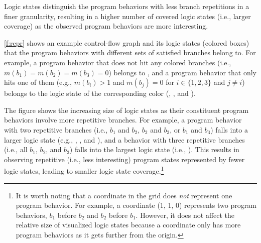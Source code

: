 \documentclass[letterpaper,twocolumn,10pt]{article}
\begin{document}
Logic states distinguish the program behaviors with less branch repetitions in a
finer granularity, resulting in a higher number of covered logic states (i.e.,
larger coverage) as the observed program behaviors are more interesting.


\autoref{f:repr} shows an example control-flow graph and its logic states
(colored boxes) that the program behaviors with different sets of satisfied
branches belong to.
For example, a program behavior that does not hit any colored branches (i.e.,
$m(b_1)=m(b_2)=m(b_3)=0$) belongs to , and a program
behavior that only hits one of them (e.g., $m(b_i)>1$ and $m(b_j)=0$ for $i \in
\{1,2,3\}$ and $j \ne i$) belongs to the logic state of the corresponding color
(, , and ).

The figure shows the increasing size of logic states as their constituent
program behaviors involve more repetitive branches. For example, a program
behavior with two repetitive branches (i.e., $b_1$ and $b_2$, $b_2$ and $b_3$,
or $b_1$ and $b_3$) falls into a larger logic state (e.g., ,
, and ), and a behavior with three repetitive branches
(i.e., all $b_1$, $b_2$, and $b_3$) falls into the largest logic state (i.e.,
).
%
This results in observing repetitive (i.e., less interesting) program states
represented by fewer logic states, leading to smaller logic state
coverage.\footnote{It is worth noting that a coordinate in the grid does
\emph{not} represent one program behavior. For example, a coordinate (1, 1, 0)
represents two program behaviors, $b_1$ before $b_2$ and $b_2$ before $b_1$.
However, it does not affect the relative size of visualized logic states because
a coordinate only has more program behaviors as it gets further from the
origin.}

\end{document}
